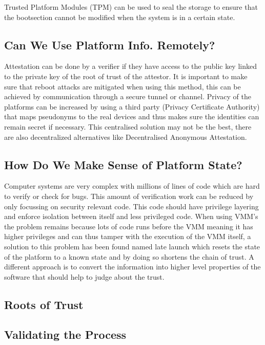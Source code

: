 \documentclass{article}
\begin{document}
Trusted Platform Modules (TPM) can be used to seal the storage to ensure that the bootsection cannot be modified when the system is in a certain state. 

\subsection{Can We Use Platform Info. Remotely?}

Attestation can be done by a verifier if they have access to the public key linked to the private key of the root of trust of the attestor. It is important to make sure that reboot attacks are mitigated when using this method, this can be achieved by communication through a secure tunnel or channel. Privacy of the platforms can be increased by using a third party (Privacy Certificate Authority) that maps pseudonyms to the real devices and thus makes sure the identities can remain secret if necessary. This centralised solution may not be the best, there are also decentralized alternatives like Decentralised Anonymous Attestation. 

\subsection{How Do We Make Sense of Platform State?}

Computer systems are very complex with millions of lines of code which are hard to verify or check for bugs. This amount of verification work can be reduced by only focussing on security relevant code. This code should have privilege layering and enforce isolation between itself and less privileged code. When using VMM's the problem remains because lots of code runs before the VMM meaning it has higher privileges and can thus tamper with the execution of the VMM itself, a solution to this problem has been found named late launch which resets the state of the platform to a known state and by doing so shortens the chain of trust. A different approach is to convert the information into higher level properties of the software that should help to judge about the trust.

\subsection{Roots of Trust}

\subsection{Validating the Process}
\end{document}
